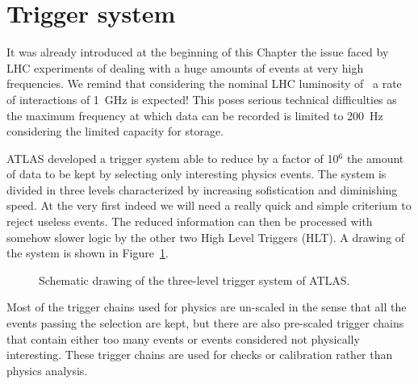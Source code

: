 \section{Trigger system}\label{sec:trigger}

It was already introduced at the beginning of this Chapter the issue
faced by LHC experiments of dealing with a huge amounts of events
at very high frequencies. We remind that considering the nominal LHC
luminosity of \highL\ a rate of interactions of 1~GHz is expected!
This poses serious technical difficulties as the maximum frequency
at which data can be recorded is limited to 200~Hz considering the
limited capacity for storage.

ATLAS developed a trigger system able to reduce by a factor of 10$^6$
the amount of data to be kept by selecting only interesting physics events.
The system is divided in three levels characterized by increasing sofistication
and diminishing speed. At the very first indeed we will need a really quick and
simple criterium to reject useless events. The reduced information can then be
processed with somehow slower logic by the other two High Level Triggers (HLT).
A drawing of the system is shown in Figure~\ref{fig:trigger}.

\begin{figure}[tb]\begin{center}
	\caption{Schematic drawing of the three-level trigger system of ATLAS.\label{fig:trigger}}
\end{center}\end{figure}

Most of the trigger chains used for physics are un-scaled in the
sense that all the events passing the selection are kept, but there
are also pre-scaled trigger chains that contain either too many events
or events considered not physically interesting. These trigger chains
are used for checks or calibration rather than physics analysis.


